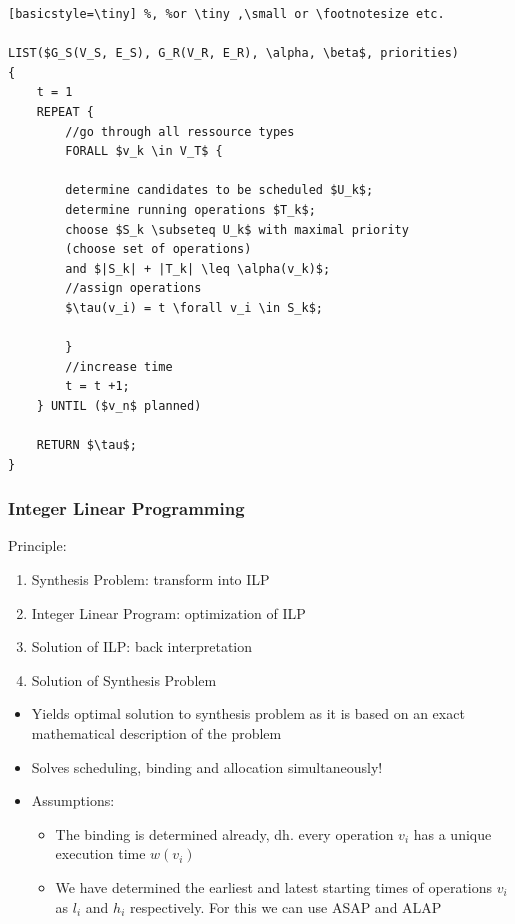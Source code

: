 \begin{lstlisting}[mathescape][basicstyle=\tiny] %, %or \tiny ,\small or \footnotesize etc.

LIST($G_S(V_S, E_S), G_R(V_R, E_R), \alpha, \beta$, priorities)
{
	t = 1
	REPEAT {
		//go through all ressource types
		FORALL $v_k \in V_T$ {
			
		determine candidates to be scheduled $U_k$;
		determine running operations $T_k$;
		choose $S_k \subseteq U_k$ with maximal priority
		(choose set of operations)
		and $|S_k| + |T_k| \leq \alpha(v_k)$;
		//assign operations
		$\tau(v_i) = t \forall v_i \in S_k$;
		
		}
		//increase time
		t = t +1;
	} UNTIL ($v_n$ planned)
	
	RETURN $\tau$;
}
\end{lstlisting}


\subsubsection{Integer Linear Programming}

Principle:

\begin{enumerate}[noitemsep]
\item Synthesis Problem: transform into ILP
\item Integer Linear Program: optimization of ILP
\item Solution of ILP: back interpretation
\item Solution of Synthesis Problem
\end{enumerate}

\begin{itemize}[noitemsep]
\item Yields optimal solution to synthesis problem as it is based on an exact mathematical description of the problem
\item Solves scheduling, binding and allocation simultaneously!
\item Assumptions:
	\begin{itemize}
	\item The binding is determined already, dh. every operation $v_i$ has a unique execution time $w(v_i)$
	\item We have determined the earliest and latest starting times of operations $v_i$ as $l_i$ and $h_i$ respectively. For this we can use ASAP and ALAP
	\end{itemize}
\end{itemize}


